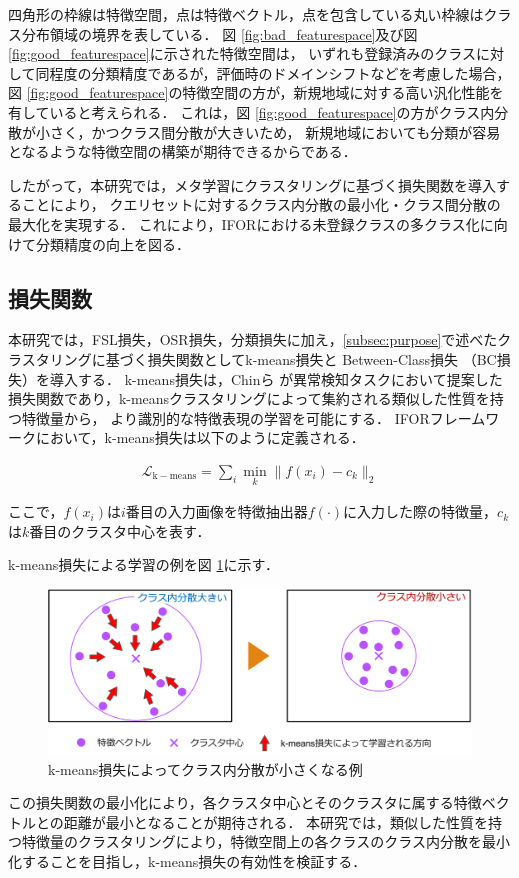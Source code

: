 % 
四角形の枠線は特徴空間，点は特徴ベクトル，点を包含している丸い枠線はクラス分布領域の境界を表している．
図 \ref{fig:bad_featurespace}及び図 \ref{fig:good_featurespace}に示された特徴空間は，
いずれも登録済みのクラスに対して同程度の分類精度であるが，評価時のドメインシフトなどを考慮した場合，
図 \ref{fig:good_featurespace}の特徴空間の方が，新規地域に対する高い汎化性能を有していると考えられる．
これは，図 \ref{fig:good_featurespace}の方がクラス内分散が小さく，かつクラス間分散が大きいため，
新規地域においても分類が容易となるような特徴空間の構築が期待できるからである．

したがって，本研究では，メタ学習にクラスタリングに基づく損失関数を導入することにより，
クエリセットに対するクラス内分散の最小化・クラス間分散の最大化を実現する．
これにより，IFORにおける未登録クラスの多クラス化に向けて分類精度の向上を図る．

\subsection{損失関数}

本研究では，FSL損失，OSR損失，分類損失に加え，\ref{subsec:purpose}で述べたクラスタリングに基づく損失関数としてk-means損失と Between-Class損失 （BC損失）を導入する．
k-means損失は，Chinら \cite{k-means}が異常検知タスクにおいて提案した損失関数であり，k-meansクラスタリングによって集約される類似した性質を持つ特徴量から，
より識別的な特徴表現の学習を可能にする．
IFORフレームワークにおいて，k-means損失は以下のように定義される．

\begin{align}
\mathcal{L}_{\mathrm{k-means}} = \sum_i{\min_k \lVert f(x_i)-c_k \rVert_2}
\end{align}

\noindent
ここで，$f(x_i)$は$i$番目の入力画像を特徴抽出器$f(\cdot)$に入力した際の特徴量，$c_k$は$k$番目のクラスタ中心を表す．

k-means損失による学習の例を図 \ref{fig:kmeans_loss}に示す．
% 
\begin{figure}[tbp]
  \centering
  \includegraphics[width=\linewidth, keepaspectratio]{image/kmeans_loss.png}
  \caption{k-means損失によってクラス内分散が小さくなる例}
  \label{fig:kmeans_loss}
\end{figure}
% 
この損失関数の最小化により，各クラスタ中心とそのクラスタに属する特徴ベクトルとの距離が最小となることが期待される．
本研究では，類似した性質を持つ特徴量のクラスタリングにより，特徴空間上の各クラスのクラス内分散を最小化することを目指し，k-means損失の有効性を検証する．

